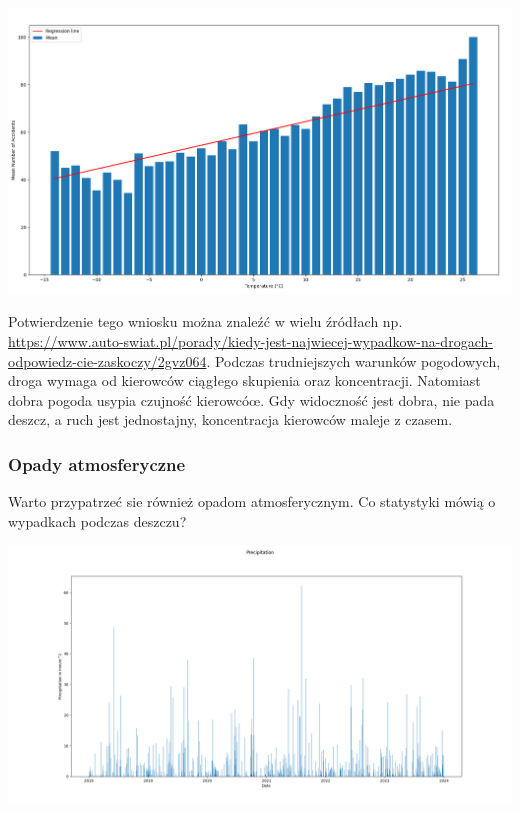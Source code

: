 \documentclass{article}
\begin{document}
 \begin{center}
    \includegraphics[scale=0.3]{visualization/temp_vs_accidents_regress.png}
    \captionsetup{hypcap=false}
    \label{fig:temp_vs_accidents_regress}
\end{center}


Potwierdzenie tego wniosku można znaleźć w wielu źródłach np. \url{https://www.auto-swiat.pl/porady/kiedy-jest-najwiecej-wypadkow-na-drogach-odpowiedz-cie-zaskoczy/2gvz064}. Podczas trudniejszych warunków pogodowych, droga wymaga od kierowców ciągłego skupienia oraz koncentracji. Natomiast dobra pogoda usypia czujność kierowcóœ. Gdy widoczność jest dobra, nie pada deszcz, a ruch jest jednostajny, koncentracja kierowców maleje z czasem.

\subsubsection{Opady atmosferyczne}

Warto przypatrzeć sie również opadom atmosferycznym. Co statystyki mówią o wypadkach podczas deszczu? 

 \begin{center}
    \includegraphics[scale=0.3]{visualization/precips.png}
    \captionsetup{hypcap=false}
    \label{fig:precips}
\end{center}
\end{document}
